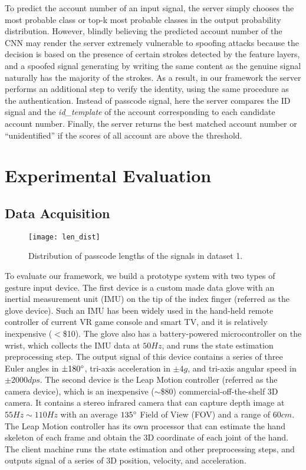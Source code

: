\documentclass[conference]{IEEEtran}
\begin{document}
To predict the account number of an input signal, the server simply chooses the most probable class or top-k most probable classes in the output probability distribution. However, blindly believing the predicted account number of the CNN may render the server extremely vulnerable to spoofing attacks because the decision is based on the presence of certain strokes detected by the feature layers, and a spoofed signal generating by writing the same content as the genuine signal naturally has the majority of the strokes. As a result, in our framework the server performs an additional step to verify the identity, using the same procedure as the authentication. Instead of passcode signal, here the server compares the ID signal and the \textit{id\_template} of the account corresponding to each candidate account number. Finally, the server returns the best matched account number or ``unidentified'' if the scores of all account are above the threshold. 

\section{Experimental Evaluation}

\subsection{Data Acquisition}

\begin{figure}[!t]
\centering
\texttt{[image: len\_dist]}
\caption{Distribution of passcode lengths of the signals in dataset 1.}
\label{fig:len_dist}
\end{figure}


To evaluate our framework, we build a prototype system with two types of gesture input device. The first device is a custom made data glove with an inertial measurement unit (IMU) on the tip of the index finger (referred as the glove device). Such an IMU has been widely used in the hand-held remote controller of current VR game console and smart TV, and it is relatively inexpensive ($<$\$10). The glove also has a battery-powered microcontroller on the wrist, which collects the IMU data at $50 Hz$, and runs the state estimation preprocessing step. The output signal of this device contains a series of three Euler angles in $\pm 180\degree$, tri-axis acceleration in $\pm 4g$, and tri-axis angular speed in $\pm 2000dps$. The second device is the Leap Motion controller (referred as the camera device), which is an inexpensive ($\sim$\$80) commercial-off-the-shelf 3D camera. It contains a stereo infrared camera that can capture depth image at $55 Hz \sim 110 Hz$ with an average $135\degree$ Field of View (FOV) and a range of $60 cm$. The Leap Motion controller has its own processor that can estimate the hand skeleton of each frame and obtain the 3D coordinate of each joint of the hand. The client machine runs the state estimation and other preprocessing steps, and outputs signal of a series of 3D position, velocity, and acceleration. 
\end{document}
